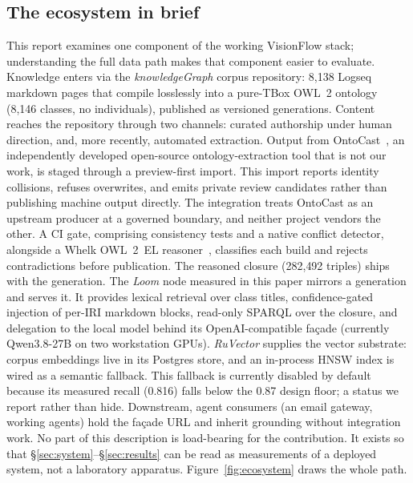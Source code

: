 \documentclass[10pt,twocolumn]{article}
\begin{document}
\subsection{The ecosystem in brief}\label{sec:ecosystem}
This report examines one component of the working VisionFlow stack; understanding the full data path makes that component easier to evaluate. Knowledge enters via the \emph{knowledgeGraph} corpus repository: 8{,}138 Logseq markdown pages that compile losslessly into a pure-TBox OWL~2 ontology (8{,}146 classes, no individuals), published as versioned generations. Content reaches the repository through two channels: curated authorship under human direction, and, more recently, automated extraction. Output from OntoCast~\cite{ontocast}, an independently developed open-source ontology-extraction tool that is not our work, is staged through a preview-first import. This import reports identity collisions, refuses overwrites, and emits private review candidates rather than publishing machine output directly. The integration treats OntoCast as an upstream producer at a governed boundary, and neither project vendors the other. A CI gate, comprising consistency tests and a native conflict detector, alongside a Whelk OWL~2~EL reasoner~\cite{whelk}, classifies each build and rejects contradictions before publication. The reasoned closure (282{,}492 triples) ships with the generation. The \emph{Loom} node measured in this paper mirrors a generation and serves it. It provides lexical retrieval over class titles, confidence-gated injection of per-IRI markdown blocks, read-only SPARQL over the closure, and delegation to the local model behind its OpenAI-compatible fa\c{c}ade (currently Qwen3.8-27B on two workstation GPUs). \emph{RuVector} supplies the vector substrate: corpus embeddings live in its Postgres store, and an in-process HNSW index is wired as a semantic fallback. This fallback is currently disabled by default because its measured recall (0.816) falls below the 0.87 design floor; a status we report rather than hide. Downstream, agent consumers (an email gateway, working agents) hold the fa\c{c}ade URL and inherit grounding without integration work. No part of this description is load-bearing for the contribution. It exists so that \S\ref{sec:system}--\S\ref{sec:results} can be read as measurements of a deployed system, not a laboratory apparatus. Figure~\ref{fig:ecosystem} draws the whole path.


\end{document}
